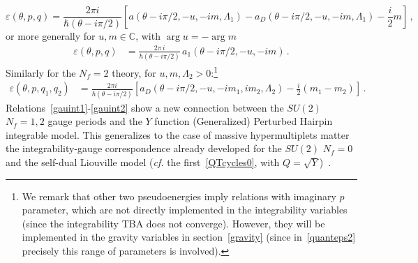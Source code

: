 \documentclass[11pt,a4paper]{elsarticle}
\def \h {\hbar}
\def \th {\theta}
\def \L {\Lambda}
\def \ve {\varepsilon}
\def \ba {\begin{aligned}}
\def \ea {\end{aligned}}
\newcommand{\be}{\begin{equation}}
\newcommand{\ee}{\end{equation}}
\def\h{\hbar}
\def\th{\theta}
\def \L {\Lambda}
\numberwithin{figure}{section}
\numberwithin{table}{section}
\begin{document}
\be \label{gauint1}
\ve(\th,p, q) = \frac{2\pi  i}{\h(\th-i\pi/2)}\left[a(\th-i\pi/2,-u,- i m,\Lambda_1)-a_D(\th-i\pi/2,-u,-i m,\Lambda_1) -\frac{i}{2}m  \right] \,,%
\ee 
or more generally for $u,m \in \mathbb{C}$, with $\arg u = - \arg m$
\be 
\ba\label{gaupseudocycles}
\ve(\th,p,q) &=
\frac{2\pi  \,i}{\h(\th-i\pi/2)}\, a_1(\th-i\pi/2,-u,-i m)\,. 
\ea 
\ee 
Similarly for the $N_f=2$ theory, for $u,m,\L_2>0$:\footnote{We remark that other two pseudoenergies imply relations with imaginary $p$ parameter, which are not directly implemented in the integrability variables (since the integrability TBA does not converge). However, they will be implemented in the gravity variables in section~\ref{gravity} (since in~\eqref{quanteps2} precisely this range of parameters is involved).}
\be \label{gauint2}
\ba
\varepsilon(\th,p,q_1,q_2)&=\frac{2  \pi i}{\hbar(\theta-i \pi/2)}\left[a_D(\th-i \pi/2,-u,-i m_1,i m_2,\Lambda_2) -\frac{i}{2 } (m_1-m_2) \right] \,.%
\ea
\ee
Relations~\eqref{gauint1}-\eqref{gauint2} show a new connection between the $SU(2)$ $N_f=1,2$ gauge periods and the $Y$ function (Generalized) Perturbed Hairpin integrable model. This generalizes to the case of massive hypermultiplets matter the integrability-gauge correspondence already developed for the $SU(2)$ $N_f=0$ and the self-dual Liouville model (\textit{cf.} the first~\eqref{QTcycles0}, with $Q=\sqrt{Y}$)~\cite{FioravantiGregori:2019}. 

\end{document}
